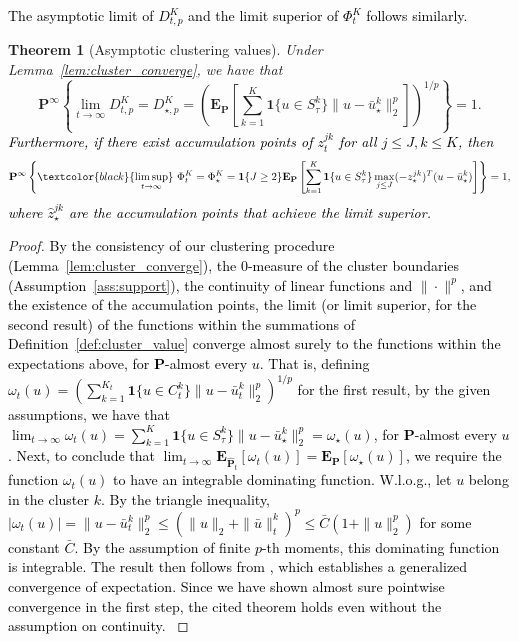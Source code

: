 \documentclass[12pt]{article}
\newcommand{\ones}{\mathbf 1}
\newcommand{\prob}{{\mathbf P}}
\newcommand{\barp}{p}
\newtheorem{theorem}{Theorem}[section]  %
\newcommand{\RC}[1]{\textcolor{black}{#1}}
\newcommand{\RC}[1]{\textcolor{blue}{#1}}
\begin{document}
\RC{The asymptotic limit of $D^K_{t,\barp}$ and the limit superior of $\Phi^K_t$ follows similarly.} 
\begin{theorem}[Asymptotic clustering values]
\label{thm:asy_cluster}
Under Lemma~\ref{lem:cluster_converge}, we have that 
$$\prob^{\infty}\left\{\lim_{t\to\infty} D^K_{t,\barp} = D^K_{\star,\barp}= \left(\mathbf{E}_{\prob}\left[\sum_{k=1}^{K}\ones\{u \in S^k_\tau\}\|u - \bar{u}^k_\star\|^{\barp}_2 \right]\right)^{1/{\barp}} \right\} = 1.$$
\RC{Furthermore, if there exist accumulation points of $z_t^{jk}$ for all $j\leq J,k\leq K$, then}
$$\prob^{\infty}\left\{\RC{\limsup_{t\to\infty}}~\Phi^K_t = \Phi^K_\star = \ones\{J\geq2\}\mathbf{E}_{\prob}\left[\sum_{k=1}^{K}\ones\{u \in S^k_\tau\}\max_{j\leq J}(-z^{jk}_\star)^T(u - \bar{u}^k_\star) \right] \right\} = 1,$$
\RC{where $\hat{z}^{jk}_\star$ are the accumulation points that achieve the limit superior.}
\end{theorem}
\begin{proof}
\RC{By the consistency of our clustering procedure (Lemma~\ref{lem:cluster_converge}), the 0-measure of the cluster boundaries (Assumption~\ref{ass:support}), the continuity of linear functions and $\|\cdot\|^{\barp}$, and the existence of the accumulation points, the limit (or limit superior, for the second result) of the functions within the summations of Definition~\ref{def:cluster_value} converge almost surely to the functions within the expectations above, for $\prob$-almost every $u$. That is, defining 
  $\omega_t(u) =  (\sum_{k=1}^{K_t}\ones\{u \in C^k_t\}\| u - \bar{u}^k_t\|_2^{\barp})^{1/{\barp}}$ for the first result, by the given assumptions, we have that $\lim_{t\to\infty} \omega_t(u) = \sum_{k=1}^{K}\ones\{u \in S^k_\tau\}\|u - \bar{u}^k_\star\|^{\barp}_2 = \omega_\star(u)$, for $\prob$-almost every $u$.
  Next, to conclude that $\lim_{t\to\infty} \mathbf{E}_{\hat{\prob}_t}[\omega_t(u)] = \mathbf{E}_{\prob}[\omega_\star(u)]$, we require the function $\omega_t(u)$ to have an integrable dominating function.
  W.l.o.g., let $u$ belong in the cluster $k$. By the triangle inequality, $|\omega_t(u)| = \|u - \bar{u}^k_t\|^{\barp}_2 \leq (\|u\|_2 + \|\bar{u}\|^k_t )^{\barp} \leq \bar{C}(1+\|u\|_2^{\barp} )$ for some constant $\bar{C}$. By the assumption of finite $\barp$-th moments, this dominating function is integrable. The result then follows from \cite[Theorem 7.12(iv)]{Villani2003Topics}, which establishes a generalized convergence of expectation. Since we have shown almost sure pointwise convergence in the first step, the cited theorem holds even without the assumption on continuity. }  
\end{proof}
\end{document}
